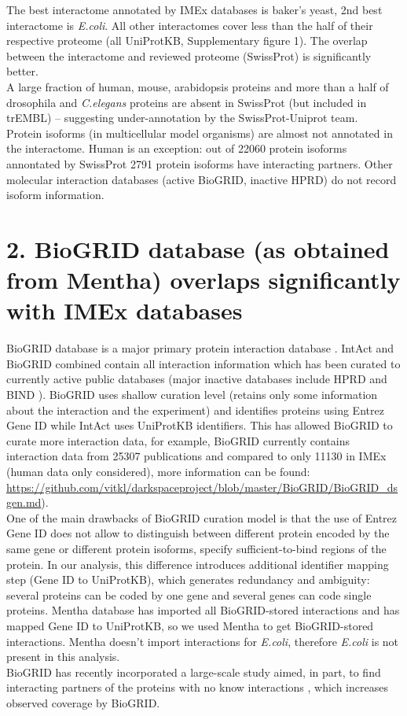 \documentclass[12pt,]{report}
\begin{document}
The best interactome annotated by IMEx databases is baker's yeast, 2nd
best interactome is \emph{E.coli}. All other interactomes cover less
than the half of their respective proteome (all UniProtKB, Supplementary
figure 1). The overlap between the interactome and reviewed proteome
(SwissProt) is significantly better.\\
A large fraction of human, mouse, arabidopsis proteins and more than a
half of drosophila and \emph{C.elegans} proteins are absent in SwissProt
(but included in trEMBL) -- suggesting under-annotation by the
SwissProt-Uniprot team.\\
Protein isoforms (in multicellular model organisms) are almost not
annotated in the interactome. Human is an exception: out of 22060
protein isoforms annontated by SwissProt 2791 protein isoforms have
interacting partners. Other molecular interaction databases (active
BioGRID, inactive HPRD) do not record isoform information.

\section{2. BioGRID database (as obtained from Mentha) overlaps
significantly with IMEx
databases}\label{biogrid-database-as-obtained-from-mentha-overlaps-significantly-with-imex-databases}

BioGRID database is a major primary protein interaction database
\citep{Chatr-Aryamontri:2017aa}. IntAct and BioGRID combined contain all
interaction information which has been curated to currently active
public databases (major inactive databases include HPRD
\citep{Peri:2004aa} and BIND \citep{Isserlin:2011aa}). BioGRID uses
shallow curation level (retains only some information about the
interaction and the experiment) and identifies proteins using Entrez
Gene ID while IntAct uses UniProtKB identifiers. This has allowed
BioGRID to curate more interaction data, for example, BioGRID currently
contains interaction data from 25307 publications and compared to only
11130 in IMEx (human data only considered), more information can be
found:
\url{https://github.com/vitkl/darkspaceproject/blob/master/BioGRID/BioGRID_dsgen.md}).\\
One of the main drawbacks of BioGRID curation model is that the use of
Entrez Gene ID does not allow to distinguish between different protein
encoded by the same gene or different protein isoforms, specify
sufficient-to-bind regions of the protein. In our analysis, this
difference introduces additional identifier mapping step (Gene ID to
UniProtKB), which generates redundancy and ambiguity: several proteins
can be coded by one gene and several genes can code single proteins.
Mentha database \citep{Calderone:2013aa} has imported all BioGRID-stored
interactions and has mapped Gene ID to UniProtKB, so we used Mentha to
get BioGRID-stored interactions. Mentha doesn't import interactions for
\emph{E.coli}, therefore \emph{E.coli} is not present in this
analysis.\\
BioGRID has recently incorporated a large-scale study aimed, in part, to
find interacting partners of the proteins with no know interactions
\citep{Huttlin:2015aa}, which increases observed coverage by BioGRID.
\end{document}
